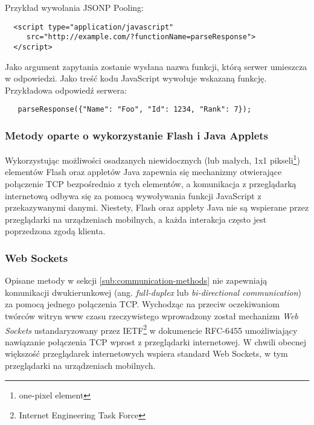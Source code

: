 \begin{description}
  Przykład wywołania JSONP Pooling:
\lstset{language=HTML}
\begin{lstlisting}
  <script type="application/javascript"
     src="http://example.com/?functionName=parseResponse">
  </script>
\end{lstlisting}
  
  Jako argument zapytania zostanie wysłana nazwa funkcji, którą serwer umieszcza w odpowiedzi. Jako treść kodu JavaScript wywołuje wskazaną funkcję. Przykładowa odpowiedź serwera:

\lstset{language=JavaScript}
\begin{lstlisting}
   parseResponse({"Name": "Foo", "Id": 1234, "Rank": 7});
\end{lstlisting}

\end{description}

\subsubsection{Metody oparte o wykorzystanie Flash i Java Applets}

Wykorzystując możliwości osadzanych niewidocznych (lub małych, 1x1 pikseli\footnote{one-pixel element}) elementów Flash oraz appletów Java zapewnia się mechanizmy otwierające połączenie TCP bezpośrednio z tych elementów, a komunikacja z przeglądarką internetową odbywa się za pomocą wywoływania funkcji JavaScript z przekazywanymi danymi. Niestety, Flash oraz applety Java nie są wspierane przez przeglądarki na urządzeniach mobilnych, a każda interakcja często jest poprzedzona zgodą klienta.

\subsubsection{Web Sockets}
\label{subsub:websockets}

Opisane metody w sekcji \ref{sub:communication-methods} nie zapewniają komunikacji dwukierunkowej (ang. \emph{full-duplex} lub \emph{bi-directional communication}) za pomocą jednego połączenia TCP. Wychodząc na przeciw oczekiwaniom twórców witryn www czasu rzeczywistego wprowadzony został mechanizm \emph{Web Sockets} ustandaryzowany przez IETF\footnote{Internet Engineering Task Force} w dokumencie RFC-6455\cite{websockets-rfc} umożliwiający nawiązanie połączenia TCP wprost z przeglądarki internetowej. W chwili obecnej większość przeglądarek internetowych wspiera standard Web Sockets\cite{caniuse-websockets}, w tym przeglądarki na urządzeniach mobilnych.

